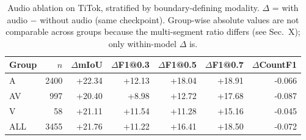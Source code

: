 \begin{table}[t]
\centering\small
\caption{Audio ablation on TiTok, stratified by boundary-defining modality. $\Delta$ = with audio $-$ without audio (same checkpoint). Group-wise absolute values are not comparable across groups because the multi-segment ratio differs (see Sec.~X); only within-model $\Delta$ is.}
\label{tab:audio_ablation_modality}
\begin{tabular}{lrrrrrr}
\toprule
Group & $n$ & $\Delta$mIoU & $\Delta$F1@0.3 & $\Delta$F1@0.5 & $\Delta$F1@0.7 & $\Delta$CountF1 \\
\midrule
A & 2400 & +22.34 & +12.13 & +18.04 & +18.91 & -0.066 \\
AV & 997 & +20.40 & +8.98 & +12.72 & +17.68 & -0.087 \\
V & 58 & +21.11 & +11.54 & +11.28 & +15.16 & -0.045 \\
ALL & 3455 & +21.76 & +11.22 & +16.41 & +18.50 & -0.072 \\
\bottomrule
\end{tabular}
\end{table}

